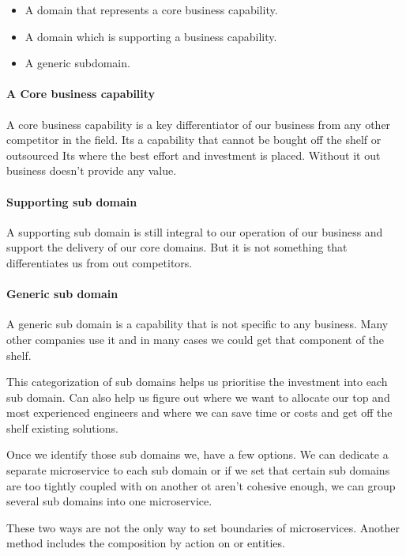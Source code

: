 \begin{itemize}
    \item A domain that represents a core business capability.
    \item A domain which is supporting a business capability.
    \item A generic subdomain.
\end{itemize}

\paragraph{A Core business capability}
A core business capability is a key differentiator of our business from any other competitor in the field.
Its a capability that cannot be bought off the shelf or outsourced
Its where the best effort and investment is placed.
Without it out business doesn't provide any value.

\paragraph{Supporting sub domain}
A supporting sub domain is still integral to our operation of our business and support the delivery of our core domains.
But it is not something that differentiates us from out competitors.

\paragraph{Generic sub domain}
A generic sub domain is a capability that is not specific to any business.
Many other companies use it and in many cases we could get that component of the shelf.

This categorization of sub domains helps us prioritise the investment into each sub domain.
Can also help us figure out where we want to allocate our top and most experienced engineers and where we can save time or costs and get off the shelf existing solutions.

Once we identify those sub domains we, have a few options.
We can dedicate a separate microservice to each sub domain or if we set that certain sub domains are too tightly coupled with on another ot aren't cohesive enough, we can group several sub domains into one microservice.

\begin{note}
    These two ways are not the only way to set boundaries of microservices.
    Another method includes the composition by action on or entities.
\end{note}

